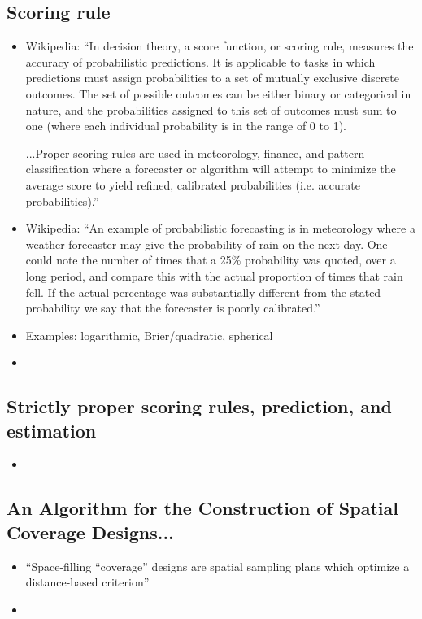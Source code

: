 \documentclass{article}
\begin{document}
\subsection*{Scoring rule}
\begin{itemize}
\item Wikipedia: ``In decision theory, a score function, or scoring rule, measures the accuracy of probabilistic predictions. It is applicable to tasks in which predictions must assign probabilities to a set of mutually exclusive discrete outcomes. The set of possible outcomes can be either binary or categorical in nature, and the probabilities assigned to this set of outcomes must sum to one (where each individual probability is in the range of 0 to 1). 

...Proper scoring rules are used in meteorology, finance, and pattern classification where a forecaster or algorithm will attempt to minimize the average score to yield refined, calibrated probabilities (i.e. accurate probabilities).''
\item Wikipedia: ``An example of probabilistic forecasting is in meteorology where a weather forecaster may give the probability of rain on the next day. One could note the number of times that a 25\% probability was quoted, over a long period, and compare this with the actual proportion of times that rain fell. If the actual percentage was substantially different from the stated probability we say that the forecaster is poorly calibrated.''
\item Examples: logarithmic, Brier/quadratic, spherical
\item 
\end{itemize}

\subsection*{Strictly proper scoring rules, prediction, and estimation }
\citep{Gneiting2007}
\begin{itemize}
\item 
\end{itemize}



\subsection*{An Algorithm for the Construction of Spatial Coverage Designs... \citep{Nychka1998}}
\begin{itemize}
\item ``Space-filling ``coverage'' designs are spatial sampling plans which optimize a distance-based criterion''
\item 
\end{itemize}
\end{document}
